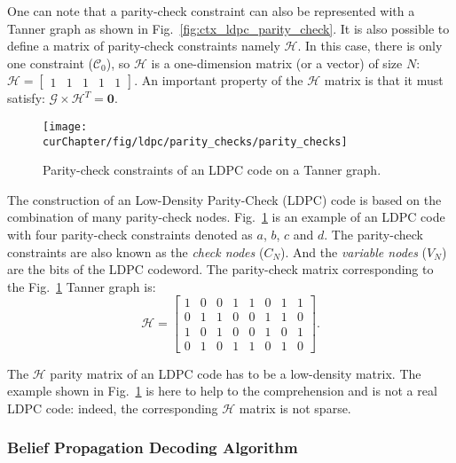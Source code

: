 One can note that a parity-check constraint can also be represented with a
Tanner graph as shown in Fig.~\ref{fig:ctx_ldpc_parity_check}. It is also
possible to define a matrix of parity-check constraints namely
$\bm{\mathcal{H}}$. In this case, there is only one constraint
($\mathcal{C}_0$), so $\bm{\mathcal{H}}$ is a one-dimension matrix (or a vector)
of size $N$:
$
\bm{\mathcal{H}} =
\begin{bmatrix}
1 & 1 & 1 & 1 & 1
\end{bmatrix}.
$
An important property of the $\bm{\mathcal{H}}$ matrix is that it must satisfy:
$\bm{\mathcal{G}} \times \bm{\mathcal{H}}^T = \bm{0}.$

\begin{figure}[htp]
  \centering
  \texttt{[image: \\curChapter/fig/ldpc/parity\_checks/parity\_checks]}
  \caption{Parity-check constraints of an LDPC code on a Tanner graph.}
  \label{fig:ctx_ldpc_parity_checks}
\end{figure}

The construction of an Low-Density Parity-Check (LDPC) code is based on the
combination of many parity-check nodes. Fig.~\ref{fig:ctx_ldpc_parity_checks} is
an example of an LDPC code with four parity-check constraints denoted as $a$,
$b$, $c$ and $d$. The parity-check constraints are also known as the \emph{check
nodes} ($C_N$). And the \emph{variable nodes} ($V_N$) are the bits of the LDPC
codeword. The parity-check matrix corresponding to the
Fig.~\ref{fig:ctx_ldpc_parity_checks} Tanner graph is:
\begin{equation*}
\bm{\mathcal{H}} =
\begin{bmatrix}
  1 & 0 & 0 & 1 & 1 & 0 & 1 & 1\\
  0 & 1 & 1 & 0 & 0 & 1 & 1 & 0\\
  1 & 0 & 1 & 0 & 0 & 1 & 0 & 1\\
  0 & 1 & 0 & 1 & 1 & 0 & 1 & 0
\end{bmatrix}.
\end{equation*}

The $\bm{\mathcal{H}}$ parity matrix of an LDPC code has to be a low-density
matrix. The example shown in
Fig.~\ref{fig:ctx_ldpc_parity_checks} is here to help to the comprehension and
is not a real LDPC code: indeed, the corresponding $\bm{\mathcal{H}}$ matrix is
not sparse.

\subsubsection{Belief Propagation Decoding Algorithm}

